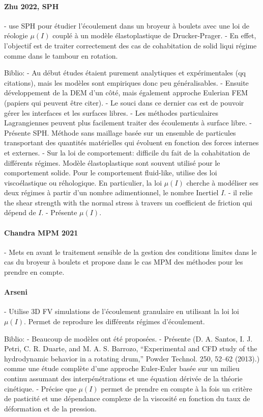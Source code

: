 \paragraph*{Zhu 2022, SPH}

- use SPH pour étudier l'écoulement dans un broyeur à boulets avec une loi de réologie $\mu (I)$ couplé à un modèle élastoplastique de Drucker-Prager.
- En effet, l'objectif est de traiter correctement des cas de cohabitation de solid liqui régime comme dans le tambour en rotation.

Biblio:
- Au début études étaient purement analytiques et expérimentales (qq citations), mais les modèles sont empiriques donc peu généralisables.
- Ensuite développement de la DEM d'un côté, mais également approche Eulerian FEM (papiers qui peuvent être citer).
- Le souci dans ce dernier cas est de pouvoir gérer les interfaces et les surfaces libres.
- Les méthodes particulaires Lagrangiennes peuvent plus facilement traiter des écoulements à surface libre.
- Présente SPH. Méthode sans maillage basée sur un ensemble de particules transportant des quantités matérielles qui évoluent en fonction des forces internes et externes.
- Sur la loi de comportement: difficile du fait de la cohabitation de différents régimes. Modèle élastoplastique sont souvent utilisé pour le comportement solide. Pour le comportement fluid-like, utilise des loi viscoélastique ou réhologique. En particulier, la loi $\mu (I)$ cherche à modéliser ses deux régimes à partir d'un nombre adimentionnel, le nombre Inertiel $I$.
- il relie the shear strength with the normal stress à travers un coefficient de friction qui dépend de $I$.
- Présente $\mu(I)$.

\paragraph*{Chandra MPM 2021}
- Mets en avant le traitement sensible de la gestion des conditions limites dans le cas du broyeur à boulets et propose dans le cas MPM des méthodes pour les prendre en compte.

\paragraph*{Arseni}
- Utilise 3D FV simulations de l'écoulement granulaire en utilisant la loi loi $\mu(I)$. Permet de reprodure les différents régimes d'écoulement.

Biblio:
- Beaucoup de modèles ont été proposées.
- Présente (D. A. Santos, I. J. Petri, C. R. Duarte, and M. A. S. Barrozo, “Experimental and CFD study of the hydrodynamic behavior in a rotating drum,” Powder Technol. 250, 52–62 (2013).) comme une étude complète d'une approche Euler-Euler basée sur un milieu continu assumant des interpénétrations et une équation dérivée de la théorie cinétique.
- Précise que $\mu(I)$ permet de prendre en compte à la fois un critère de pasticité et une dépendance complexe de la viscosité en fonction du taux de déformation et de la pression.